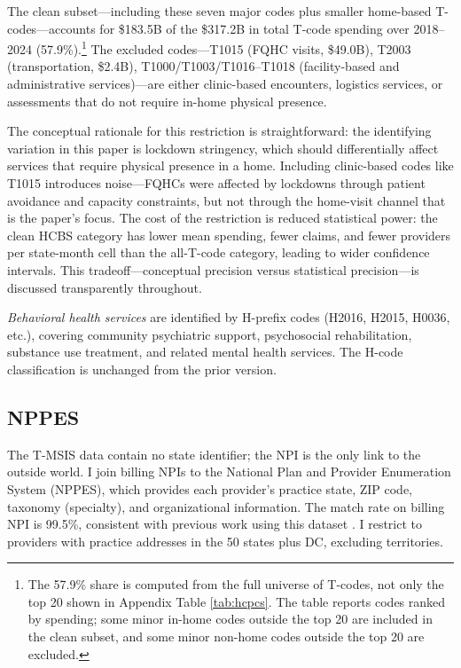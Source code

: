 \documentclass[12pt]{article}
\begin{document}
\noindent The clean subset---including these seven major codes plus smaller home-based T-codes---accounts for \$183.5B of the \$317.2B in total T-code spending over 2018--2024 (57.9\%).\footnote{The 57.9\% share is computed from the full universe of T-codes, not only the top 20 shown in Appendix Table \ref{tab:hcpcs}. The table reports codes ranked by spending; some minor in-home codes outside the top 20 are included in the clean subset, and some minor non-home codes outside the top 20 are excluded.} The excluded codes---T1015 (FQHC visits, \$49.0B), T2003 (transportation, \$2.4B), T1000/T1003/T1016--T1018 (facility-based and administrative services)---are either clinic-based encounters, logistics services, or assessments that do not require in-home physical presence.

The conceptual rationale for this restriction is straightforward: the identifying variation in this paper is lockdown stringency, which should differentially affect services that require physical presence in a home. Including clinic-based codes like T1015 introduces noise---FQHCs were affected by lockdowns through patient avoidance and capacity constraints, but not through the home-visit channel that is the paper's focus. The cost of the restriction is reduced statistical power: the clean HCBS category has lower mean spending, fewer claims, and fewer providers per state-month cell than the all-T-code category, leading to wider confidence intervals. This tradeoff---conceptual precision versus statistical precision---is discussed transparently throughout.

\textit{Behavioral health services} are identified by H-prefix codes (H2016, H2015, H0036, etc.), covering community psychiatric support, psychosocial rehabilitation, substance use treatment, and related mental health services. The H-code classification is unchanged from the prior version.

\subsection{NPPES}

The T-MSIS data contain no state identifier; the NPI is the only link to the outside world. I join billing NPIs to the National Plan and Provider Enumeration System (NPPES), which provides each provider's practice state, ZIP code, taxonomy (specialty), and organizational information. The match rate on billing NPI is 99.5\%, consistent with previous work using this dataset \citep{hhs2026tmsis}. I restrict to providers with practice addresses in the 50 states plus DC, excluding territories.
\end{document}

